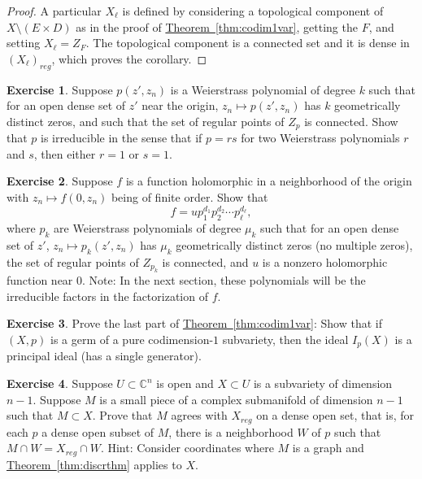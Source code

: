 \documentclass[12pt,openany]{book}
\newcommand{\C}{{\mathbb{C}}}
\theoremstyle{plain}
\theoremstyle{remark}
\theoremstyle{definition}
\newenvironment{exbox}{%
    \def\FrameCommand{\vrule width 1pt \relax\hspace{10pt}}%
    \MakeFramed{\advance\hsize-\width\FrameRestore}%
}{%
    \endMakeFramed
}
\theoremstyle{exercise}
\newtheorem{exercise}{Exercise}[section]
\theoremstyle{example}
\newcommand{\thmref}[1]{\hyperref[#1]{Theorem~\ref*{#1}}}
\begin{document}
\begin{proof}
A particular $X_\ell$ is defined by considering a topological component of $X \setminus
(E \times D)$ as in the proof of \thmref{thm:codim1var}, getting the $F$,
and setting $X_\ell = Z_F$.
The topological component is a connected set and it is dense in
$(X_\ell)_{\mathit{reg}}$, which proves the corollary.
\end{proof}

\begin{exbox}
\begin{exercise}
Suppose $p(z',z_n)$ is a Weierstrass polynomial of degree $k$ such that
for an open dense set of $z'$ near the origin,
$z_n \mapsto p(z',z_n)$ has $k$ geometrically distinct zeros, and such that the
set of regular points of $Z_p$ is connected.  Show that $p$ is
irreducible in the sense that if $p = rs$ for two Weierstrass polynomials
$r$ and $s$, then either $r=1$ or $s=1$.
\end{exercise}

\begin{exercise} \label{exercise:weierstrassfactorization}
Suppose $f$ is a function holomorphic in a neighborhood of the origin with
$z_n \mapsto f(0,z_n)$ being of finite order.  Show that
\begin{equation*}
f = u p_1^{d_1} p_2^{d_2} \cdots p_\ell^{d_\ell} ,
\end{equation*}
where $p_k$ are Weierstrass polynomials of degree $\mu_k$ such that
for an open dense set of $z'$, $z_n \mapsto p_k(z',z_n)$
has $\mu_k$ geometrically distinct zeros (no multiple zeros),
the set of regular points of $Z_{p_k}$ is
connected, and $u$ is a nonzero holomorphic function near $0$.
Note: In the next section, these
polynomials will be the irreducible factors in the factorization of $f$.
\end{exercise}

\begin{exercise} \label{exercise:singlegenerator}
Prove the last part of \thmref{thm:codim1var}:
Show that if $(X,p)$ is a germ of a pure codimension-$1$ subvariety, then
the ideal $I_p(X)$ is a principal ideal (has a single generator).
\end{exercise}

\begin{exercise} \label{exercise:hypersurfaceinhypervariety}
Suppose $U \subset \C^n$ is open and $X \subset U$
is a subvariety of dimension $n-1$.  Suppose $M$
is a small piece of a complex submanifold of dimension $n-1$ such that
$M \subset X$.  Prove that $M$ agrees with $X_{\mathit{reg}}$ on a dense
open set, that is,
for each $p$ a dense open subset of $M$,
there is a neighborhood $W$ of $p$ such that
$M \cap W = X_{\mathit{reg}} \cap W$.
Hint: Consider coordinates where
$M$ is a graph and \thmref{thm:discrthm} applies to $X$.
\end{exercise}


\end{exbox}
\end{document}
